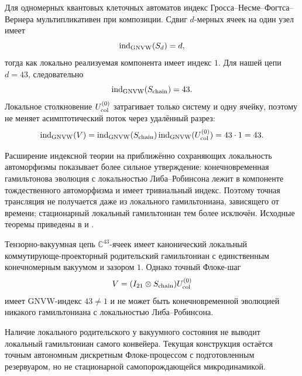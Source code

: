 Для одномерных квантовых клеточных автоматов индекс
Гросса--Несме--Фогтса--Вернера мультипликативен при композиции. Сдвиг
$d$-мерных ячеек на один узел имеет
\begin{equation}
 \operatorname{ind}_{\rm GNVW}(S_d)=d,
\end{equation}
тогда как локально реализуемая компонента имеет индекс $1$. Для нашей
цепи $d=43$, следовательно
\begin{equation}
 \operatorname{ind}_{\rm GNVW}(S_{\rm chain})=43.
\end{equation}
Локальное столкновение $U_{\rm col}^{(0)}$ затрагивает только систему и одну
ячейку, поэтому не меняет асимптотический поток через удалённый разрез:
\begin{equation}
 \operatorname{ind}_{\rm GNVW}(V)
 =\operatorname{ind}_{\rm GNVW}(S_{\rm chain})
  \operatorname{ind}_{\rm GNVW}(U_{\rm col}^{(0)})
 =43\cdot1=43.
\end{equation}

Расширение индексной теории на приближённо сохраняющих локальность
автоморфизмы показывает более сильное утверждение: конечновременная
гамильтонова эволюция с локальностью Либа--Робинсона лежит в компоненте
тождественного автоморфизма и имеет тривиальный индекс. Поэтому точная
трансляция не получается даже из локального гамильтониана, зависящего от
времени; стационарный локальный гамильтониан тем более исключён. Исходные
теоремы приведены в  и
.

\begin{theorem}
Тензорно-вакуумная цепь $\mathbb C^{43}$-ячеек имеет канонический локальный
коммутирующе-проекторный родительский гамильтониан с единственным конечномерным вакуумом и
зазором $1$. Однако точный Флоке-шаг
\begin{equation}
 V=(I_{21}\otimes S_{\rm chain})U_{\rm col}^{(0)}
\end{equation}
имеет GNVW-индекс $43\neq1$ и не может быть конечновременной эволюцией
никакого гамильтониана с локальностью Либа--Робинсона.
\end{theorem}

\begin{nogocriterion}
Наличие локального родительского у вакуумного состояния не выводит локальный
гамильтониан самого конвейера. Текущая конструкция остаётся точным
автономным дискретным Флоке-процессом с подготовленным резервуаром, но не
стационарной самопорождающейся микродинамикой.
\end{nogocriterion}

